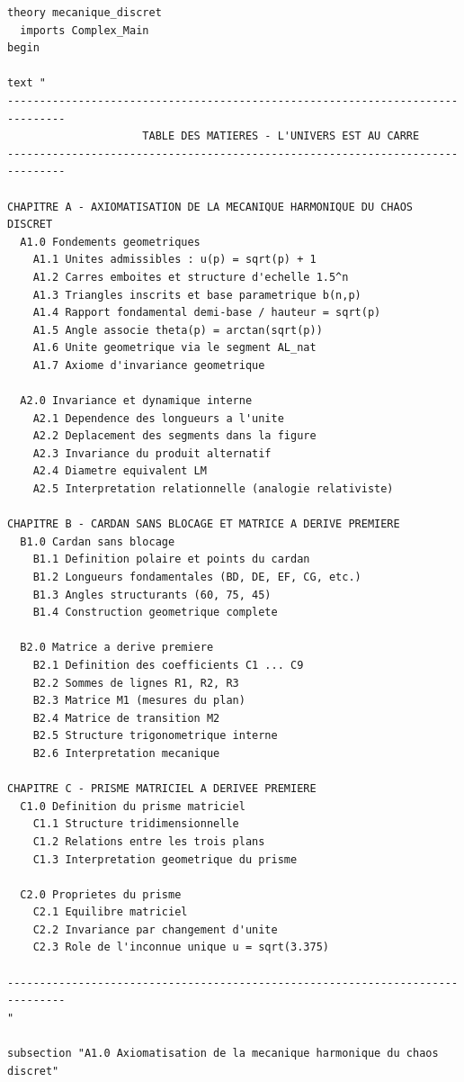 \documentclass[12pt,a4paper]{article}
\theoremstyle{definition}
\theoremstyle{remark}
\begin{document}
\begin{verbatim}
theory mecanique_discret
  imports Complex_Main
begin

text "
-------------------------------------------------------------------------------
                     TABLE DES MATIERES - L'UNIVERS EST AU CARRE
-------------------------------------------------------------------------------

CHAPITRE A - AXIOMATISATION DE LA MECANIQUE HARMONIQUE DU CHAOS DISCRET
  A1.0 Fondements geometriques
    A1.1 Unites admissibles : u(p) = sqrt(p) + 1
    A1.2 Carres emboites et structure d'echelle 1.5^n
    A1.3 Triangles inscrits et base parametrique b(n,p)
    A1.4 Rapport fondamental demi-base / hauteur = sqrt(p)
    A1.5 Angle associe theta(p) = arctan(sqrt(p))
    A1.6 Unite geometrique via le segment AL_nat
    A1.7 Axiome d'invariance geometrique

  A2.0 Invariance et dynamique interne
    A2.1 Dependence des longueurs a l'unite
    A2.2 Deplacement des segments dans la figure
    A2.3 Invariance du produit alternatif
    A2.4 Diametre equivalent LM
    A2.5 Interpretation relationnelle (analogie relativiste)

CHAPITRE B - CARDAN SANS BLOCAGE ET MATRICE A DERIVE PREMIERE
  B1.0 Cardan sans blocage
    B1.1 Definition polaire et points du cardan
    B1.2 Longueurs fondamentales (BD, DE, EF, CG, etc.)
    B1.3 Angles structurants (60, 75, 45)
    B1.4 Construction geometrique complete

  B2.0 Matrice a derive premiere
    B2.1 Definition des coefficients C1 ... C9
    B2.2 Sommes de lignes R1, R2, R3
    B2.3 Matrice M1 (mesures du plan)
    B2.4 Matrice de transition M2
    B2.5 Structure trigonometrique interne
    B2.6 Interpretation mecanique

CHAPITRE C - PRISME MATRICIEL A DERIVEE PREMIERE
  C1.0 Definition du prisme matriciel
    C1.1 Structure tridimensionnelle
    C1.2 Relations entre les trois plans
    C1.3 Interpretation geometrique du prisme

  C2.0 Proprietes du prisme
    C2.1 Equilibre matriciel
    C2.2 Invariance par changement d'unite
    C2.3 Role de l'inconnue unique u = sqrt(3.375)

-------------------------------------------------------------------------------
"

subsection "A1.0 Axiomatisation de la mecanique harmonique du chaos discret"


\end{verbatim}
\end{document}
